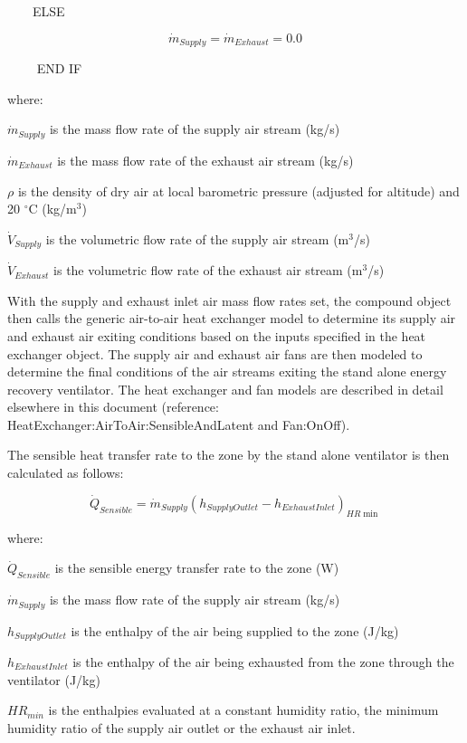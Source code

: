 ~~~~ELSE

\begin{equation}
\dot{m}_{Supply} = \dot{m}_{Exhaust} = 0.0
\end{equation}

~~~~ END IF

where:

\(\dot{m}_{Supply}\) is the mass flow rate of the supply air stream (kg/s)

\(\dot{m}_{Exhaust}\) is the mass flow rate of the exhaust air stream (kg/s)

\(\rho\) is the density of dry air at local barometric pressure (adjusted for altitude) and 20 \(^{\circ}\)C (kg/m\(^{3}\))

\(\dot{V}_{Supply}\) is the volumetric flow rate of the supply air stream (m\(^{3}\)/s)

\({\dot{V}_{Exhaust}}\) is the volumetric flow rate of the exhaust air stream (m\(^{3}\)/s)

With the supply and exhaust inlet air mass flow rates set, the compound object then calls the generic air-to-air heat exchanger model to determine its supply air and exhaust air exiting conditions based on the inputs specified in the heat exchanger object. The supply air and exhaust air fans are then modeled to determine the final conditions of the air streams exiting the stand alone energy recovery ventilator. The heat exchanger and fan models are described in detail elsewhere in this document (reference: HeatExchanger:AirToAir:SensibleAndLatent and Fan:OnOff).

The sensible heat transfer rate to the zone by the stand alone ventilator is then calculated as follows:

\begin{equation}
  \dot{Q}_{Sensible} = \dot{m}_{Supply} \left( h_{SupplyOutlet} - h_{ExhaustInlet} \right)_{HR\min }
\end{equation}

where:

\(\dot{Q}_{Sensible}\) is the sensible energy transfer rate to the zone (W)

\(\dot{m}_{Supply}\) is the mass flow rate of the supply air stream (kg/s)

\(h_{SupplyOutlet}\) is the enthalpy of the air being supplied to the zone (J/kg)

\(h_{ExhaustInlet}\) is the enthalpy of the air being exhausted from the zone through the ventilator (J/kg)

\(HR_{min}\) is the enthalpies evaluated at a constant humidity ratio, the minimum humidity ratio of the supply air outlet or the exhaust air inlet.

